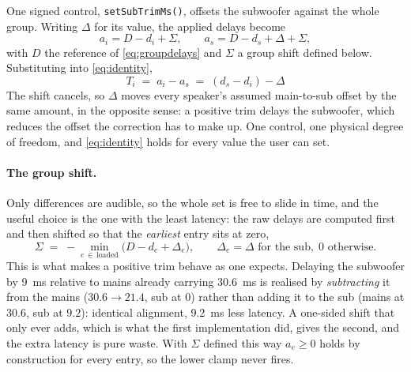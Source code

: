 \documentclass[11pt,a4paper]{article}
\newcommand{\code}[1]{\texttt{\small #1}}
\begin{document}
One signed control, \code{setSubTrimMs()}, offsets the subwoofer against the
whole group. Writing $\Delta$ for its value, the applied delays become
%
\begin{equation}
  a_i = D - d_i + \Sigma, \qquad
  a_s = D - d_s + \Delta + \Sigma,
  \label{eq:trim}
\end{equation}
%
with $D$ the reference of \eqref{eq:groupdelays} and $\Sigma$ a group shift
defined below. Substituting into \eqref{eq:identity},
%
\begin{equation}
  \boxed{\;T_i \;=\; a_i - a_s \;=\; (d_s - d_i) - \Delta\;}
  \label{eq:trim-offset}
\end{equation}
%
The shift cancels, so $\Delta$ moves every speaker's assumed main-to-sub offset
by the same amount, in the opposite sense: a positive trim delays the subwoofer,
which reduces the offset the correction has to make up. One control, one physical
degree of freedom, and \eqref{eq:identity} holds for every value the user can
set.

\paragraph{The group shift.} Only differences are audible, so the whole set is
free to slide in time, and the useful choice is the one with the least latency:
the raw delays are computed first and then shifted so that the \emph{earliest}
entry sits at zero,
%
\begin{equation}
  \Sigma \;=\; -\min_{e \,\in\, \text{loaded}} \bigl(D - d_e + \Delta_e\bigr),
  \qquad \Delta_e = \Delta \text{ for the sub}, \; 0 \text{ otherwise.}
\end{equation}
%
This is what makes a positive trim behave as one expects. Delaying the subwoofer
by \SI{9}{\milli\second} relative to mains already carrying
\SI{30.6}{\milli\second} is realised by \emph{subtracting} it from the mains
($30.6 \to 21.4$, sub at $0$) rather than adding it to the sub (mains at $30.6$,
sub at $9.2$): identical alignment, \SI{9.2}{\milli\second} less latency. A
one-sided shift that only ever adds, which is what the first implementation did,
gives the second, and the extra latency is pure waste. With $\Sigma$ defined this
way $a_e \ge 0$ holds by construction for every entry, so the lower clamp never
fires.
\end{document}
